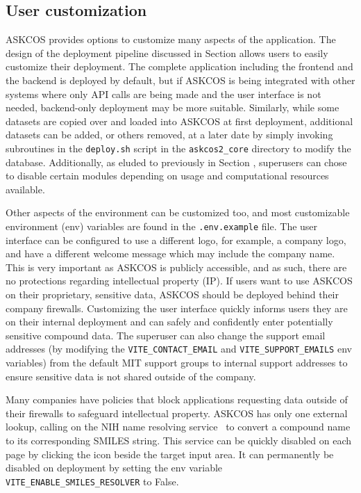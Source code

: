\documentclass[pdflatex,sn-mathphys-num]{sn-jnl}%
\theoremstyle{thmstyleone}%
\theoremstyle{thmstyletwo}%
\theoremstyle{thmstylethree}%
\begin{document}
\subsection{User customization}\label{method_customization}

ASKCOS provides options to customize many aspects of the application. The design of the deployment pipeline discussed in Section  allows users to easily customize their deployment. The complete application including the frontend and the backend is deployed by default, but if ASKCOS is being integrated with other systems where only API calls are being made and the user interface is not needed, backend-only deployment may be more suitable. Similarly, while some datasets are copied over and loaded into ASKCOS at first deployment, additional datasets can be added, or others removed, at a later date by simply invoking subroutines in the \texttt{deploy.sh} script in the \texttt{askcos2\_core} directory to modify the database. Additionally, as eluded to previously in Section , superusers can chose to disable certain modules depending on usage and computational resources available.

Other aspects of the environment can be customized too, and most customizable environment (env) variables are found in the \texttt{.env.example} file. The user interface can be configured to use a different logo, for example, a company logo, and have a different welcome message which may include the company name. This is very important as ASKCOS is publicly accessible, and as such, there are no protections regarding intellectual property (IP). If users want to use ASKCOS on their proprietary, sensitive data, ASKCOS should be deployed behind their company firewalls. Customizing the user interface quickly informs users they are on their internal deployment and can safely and confidently enter potentially sensitive compound data. The superuser can also change the support email addresses (by modifying the \texttt{VITE\_CONTACT\_EMAIL} and \texttt{VITE\_SUPPORT\_EMAILS} env variables) from the default MIT support groups to internal support addresses to ensure sensitive data is not shared outside of the company.
 
Many companies have policies that block applications requesting data outside of their firewalls to safeguard intellectual property. ASKCOS has only one external lookup, calling on the NIH name resolving service~\citep{NIHNameResolver} to convert a compound name to its corresponding SMILES string. This service can be quickly disabled on each page by clicking the icon beside the target input area. It can permanently be disabled on deployment by setting the env variable \texttt{VITE\_ENABLE\_SMILES\_RESOLVER} to False.
\end{document}
